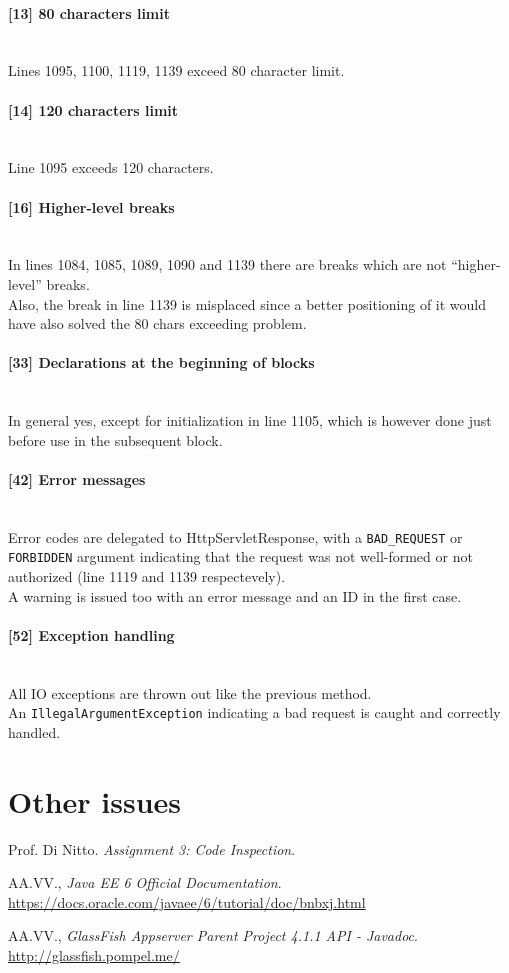 \documentclass[a4paper, 11pt]{article}
\newcommand{\code}[1]{\texttt{#1}}
\newcommand{\issue}[3][?]{
    \paragraph{[#1] #2} \mbox{}\\ #3
}
\begin{document}
\issue[13]{80 characters limit}{
    Lines 1095, 1100, 1119, 1139 exceed 80 character limit.
}

\issue[14]{120 characters limit} {
    Line 1095 exceeds 120 characters.
}

\issue[16]{Higher-level breaks} {
In lines 1084, 1085, 1089, 1090 and 1139 there are breaks which are not
``higher-level''  breaks. \\
Also, the break in line 1139 is misplaced since a better positioning of it 
would have also solved the 80 chars exceeding problem.
}

\issue[33]{Declarations at the beginning of blocks} {
In general yes, except for initialization in line 1105, which is however done 
just before use in the subsequent block.
}

\issue[42]{Error messages} {
Error codes are delegated to HttpServletResponse, with a \code{BAD\_REQUEST}
or \code{FORBIDDEN} argument indicating that the request was not well-formed 
or not authorized (line 1119 and 1139 respectevely). \\ 
A warning is issued too with an error message and an ID in the first case.
}

\issue[52]{Exception handling} {
All IO exceptions are thrown out like the previous method. \\
An \code{IllegalArgumentException} indicating a bad request is caught 
and correctly handled.
}


\newpage
\section{Other issues}

\appendix

\clearpage
{}

\begin{thebibliography}{9}
 Prof. Di Nitto.
\emph{Assignment 3: Code Inspection}.

 AA.VV.,
\emph{Java EE 6 Official Documentation}.
\url{https://docs.oracle.com/javaee/6/tutorial/doc/bnbxj.html}

 AA.VV.,
\emph{GlassFish Appserver Parent Project 4.1.1 API - Javadoc}.
\url{http://glassfish.pompel.me/}
\end{thebibliography}
\end{document}
